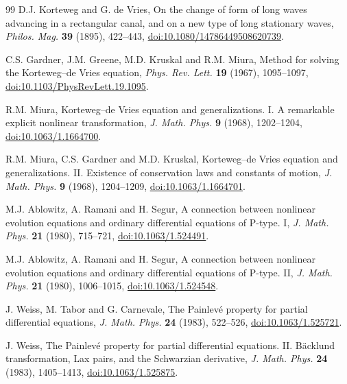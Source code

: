 \documentclass[11pt]{article}
\begin{document}
\begin{thebibliography}{99}
D.J. Korteweg and G. de Vries, On the change of form of long waves advancing in a rectangular canal, and on a new type of long stationary waves, \emph{Philos. Mag.} \textbf{39} (1895), 422--443, \href{https://doi.org/10.1080/14786449508620739}{doi:10.1080/14786449508620739}.

C.S. Gardner, J.M. Greene, M.D. Kruskal and R.M. Miura, Method for solving the Korteweg--de Vries equation, \emph{Phys. Rev. Lett.} \textbf{19} (1967), 1095--1097, \href{https://doi.org/10.1103/PhysRevLett.19.1095}{doi:10.1103/PhysRevLett.19.1095}.

R.M. Miura, Korteweg--de Vries equation and generalizations. I. A remarkable explicit nonlinear transformation, \emph{J. Math. Phys.} \textbf{9} (1968), 1202--1204, \href{https://doi.org/10.1063/1.1664700}{doi:10.1063/1.1664700}.

R.M. Miura, C.S. Gardner and M.D. Kruskal, Korteweg--de Vries equation and generalizations. II. Existence of conservation laws and constants of motion, \emph{J. Math. Phys.} \textbf{9} (1968), 1204--1209, \href{https://doi.org/10.1063/1.1664701}{doi:10.1063/1.1664701}.

M.J. Ablowitz, A. Ramani and H. Segur, A connection between nonlinear evolution equations and ordinary differential equations of P-type. I, \emph{J. Math. Phys.} \textbf{21} (1980), 715--721, \href{https://doi.org/10.1063/1.524491}{doi:10.1063/1.524491}.

M.J. Ablowitz, A. Ramani and H. Segur, A connection between nonlinear evolution equations and ordinary differential equations of P-type. II, \emph{J. Math. Phys.} \textbf{21} (1980), 1006--1015, \href{https://doi.org/10.1063/1.524548}{doi:10.1063/1.524548}.

J. Weiss, M. Tabor and G. Carnevale, The Painlev\'e property for partial differential equations, \emph{J. Math. Phys.} \textbf{24} (1983), 522--526, \href{https://doi.org/10.1063/1.525721}{doi:10.1063/1.525721}.

J. Weiss, The Painlev\'e property for partial differential equations. II. B\"acklund transformation, Lax pairs, and the Schwarzian derivative, \emph{J. Math. Phys.} \textbf{24} (1983), 1405--1413, \href{https://doi.org/10.1063/1.525875}{doi:10.1063/1.525875}.


\end{thebibliography}
\end{document}
